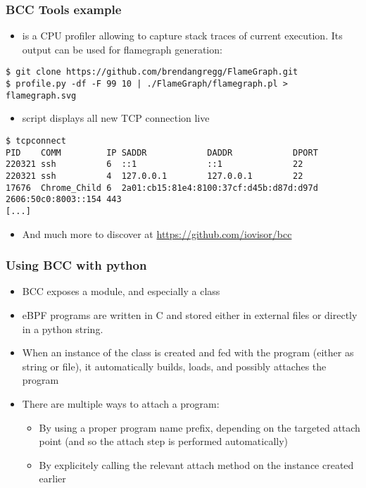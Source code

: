 \begin{frame}[fragile]
  \frametitle{BCC Tools example}
  \begin{itemize}
    \item {} is a CPU profiler allowing to capture stack traces of
          current execution. Its output can be used for flamegraph generation:
  \end{itemize}
  \begin{block}{}
    \begin{verbatim}
$ git clone https://github.com/brendangregg/FlameGraph.git
$ profile.py -df -F 99 10 | ./FlameGraph/flamegraph.pl > flamegraph.svg
    \end{verbatim}
  \end{block}
  \begin{itemize}
    \item {} script displays all new TCP connection live
  \end{itemize}
  \begin{block}{}
    \begin{verbatim}
$ tcpconnect
PID    COMM         IP SADDR            DADDR            DPORT
220321 ssh          6  ::1              ::1              22   
220321 ssh          4  127.0.0.1        127.0.0.1        22   
17676  Chrome_Child 6  2a01:cb15:81e4:8100:37cf:d45b:d87d:d97d 2606:50c0:8003::154 443  
[...]
    \end{verbatim}
  \end{block}
  \begin{itemize}
    \item And much more to discover at \url{https://github.com/iovisor/bcc}
  \end{itemize}
\end{frame}

\begin{frame}[fragile]
  \frametitle{Using BCC with python}
  \begin{itemize}
    \item BCC exposes a  module, and especially a  class
    \item eBPF programs are written in C and stored either in external files
    or directly in a python string.
    \item When an instance of the  class is created and fed with the
    program (either as string or file), it automatically builds, loads, and
    possibly attaches the program
    \item There are multiple ways to attach a program:
    \begin{itemize}
      \item By using a proper program name prefix, depending on the targeted
      attach point (and so the attach step is performed automatically)
      \item By explicitely calling the relevant attach method on the 
      instance created earlier
    \end{itemize}
  \end{itemize}
\end{frame}

